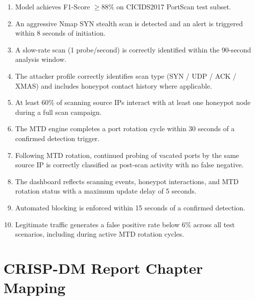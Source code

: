 \documentclass[12pt,a4paper]{article}
\begin{document}
\begin{enumerate}[nosep,leftmargin=1.5em]
  \item Model achieves F1-Score $\geq 88\%$ on CICIDS2017 PortScan test subset.
  \item An aggressive Nmap SYN stealth scan is detected and an alert is triggered
        within 8 seconds of initiation.
  \item A slow-rate scan (1 probe/second) is correctly identified within the
        90-second analysis window.
  \item The attacker profile correctly identifies scan type (SYN / UDP / ACK /
        XMAS) and includes honeypot contact history where applicable.
  \item At least 60\% of scanning source IPs interact with at least one honeypot
        node during a full scan campaign.
  \item The MTD engine completes a port rotation cycle within 30 seconds of a
        confirmed detection trigger.
  \item Following MTD rotation, continued probing of vacated ports by the same
        source IP is correctly classified as post-scan activity with no false
        negative.
  \item The dashboard reflects scanning events, honeypot interactions, and MTD
        rotation status with a maximum update delay of 5 seconds.
  \item Automated blocking is enforced within 15 seconds of a confirmed detection.
  \item Legitimate traffic generates a false positive rate below 6\% across all
        test scenarios, including during active MTD rotation cycles.
\end{enumerate}


\section{CRISP-DM Report Chapter Mapping}
\end{document}

